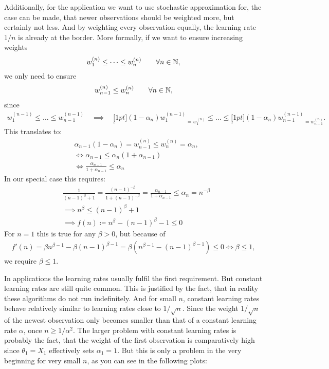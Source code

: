 Additionally, for the application we want to use stochastic approximation for, the case can be made, that newer observations should be weighted more, but certainly not less. And by weighting every observation equally, the learning rate \(1/n\) is already at the border. More formally, if we want to ensure increasing weights
\[
    w_1^{(n)} \le \dots \le w_n^{(n)}  \qquad \forall n\in\mathbb{N},
\]
we only need to ensure
\[
    w_{n-1}^{(n)} \le w_n^{(n)} \qquad \forall n\in\mathbb{N},
\]
since
\begin{align*}
    w_1^{(n-1)} \le \dots \le w_{n-1}^{(n-1)}
    \quad \implies\quad
    \underbracket[1pt]{(1-\alpha_n) w_1^{(n-1)}}_{=w_1^{(n)}} 
    \le \dots \le 
    \underbracket[1pt]{(1-\alpha_n) w_{n-1}^{(n-1)}}_{=w_{n-1}^{(n)}}.
\end{align*}
This translates to:
\begin{align*}
    &\alpha_{n-1}(1-\alpha_n) = w_{n-1}^{(n)} \le w_n^{(n)} = \alpha_n,\\
    &\iff \alpha_{n-1}\le \alpha_n(1+\alpha_{n-1})\\
    &\iff \frac{\alpha_{n-1}}{1+\alpha_{n-1}}\le \alpha_n
\end{align*}
In our special case this requires:
\begin{align*}
    &\frac{1}{(n-1)^\beta+1}=\frac{(n-1)^{-\beta}}{1+(n-1)^{-\beta}}= \frac{\alpha_{n-1}}{1+\alpha_{n-1}}\le \alpha_n= n^{-\beta}\\
    &\implies n^\beta \le (n-1)^\beta +1\\
    &\implies f(n)\coloneqq n^\beta -(n-1)^\beta -1\le 0
\end{align*}
For \(n=1\) this is true for any \(\beta>0\), but because of
\begin{align*}
    f'(n)= \beta n^{\beta-1} -\beta(n-1)^{\beta-1}=\beta(n^{\beta-1}-(n-1)^{\beta-1})\le 0 \iff \beta\le 1,
\end{align*}
we require \(\beta\le 1\).

In applications the learning rates usually fulfil the first requirement. But constant learning rates are still quite common. This is justified by the fact, that in reality these algorithms do not run indefinitely. And for small \(n\), constant learning rates behave relatively similar to learning rates close to \(1/\sqrt{n}\). Since the weight \(1/\sqrt{n}\) of the newest observation only becomes smaller than that of a constant learning rate \(\alpha\), once \(n\ge1/\alpha^2 \). The larger problem with constant learning rates is probably the fact, that the weight of the first observation is comparatively high since \(\theta_1=X_1\) effectively sets \(\alpha_1=1\). But this is only a problem in the very beginning for very small \(n\), as you can see in the following plots:

